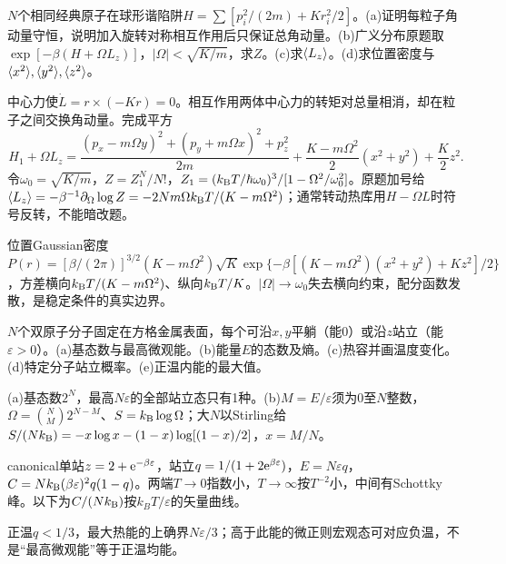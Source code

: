 \begin{exercise}[原题1(a)--(d)]\label{p:333-4-1}
$N$个相同经典原子在球形谐陷阱$H=\sum[p_i^2/(2m)+Kr_i^2/2]$。(a)证明每粒子角动量守恒，说明加入旋转对称相互作用后只保证总角动量。(b)广义分布原题取$\exp[-\beta(H+\Omega L_z)]$，$|\Omega|<\sqrt{K/m}$，求$Z$。(c)求$\langle L_z\rangle$。(d)求位置密度与$\langle x^2\rangle,\langle y^2\rangle,\langle z^2\rangle$。
\end{exercise}
\begin{solution}
中心力使$\dot L=r\times(-Kr)=0$。相互作用两体中心力的转矩对总量相消，却在粒子之间交换角动量。完成平方
\begin{equation}
H_1+\Omega L_z=\frac{(p_x-m\Omega y)^2+(p_y+m\Omega x)^2+p_z^2}{2m}+\frac{K-m\Omega^2}{2}(x^2+y^2)+\frac K2z^2.
\end{equation}
令$\omega_0=\sqrt{K/m}$，$Z=Z_1^N/N!$，$Z_1=(k_{\mathrm B} T/\hbar\omega_0)^3/[1-\Omega^2/\omega_0^2]$。原题加号给$\langle L_z\rangle=-\beta^{-1}\partial_\Omega\log Z=-2Nm\Omega k_{\mathrm B} T/(K-m\Omega^2)$；通常转动热库用$H-\Omega L$时符号反转，不能暗改题。

位置Gaussian密度$P(r)=[\beta/(2\pi)]^{3/2}(K-m\Omega^2)\sqrt K\exp\{-\beta[(K-m\Omega^2)(x^2+y^2)+Kz^2]/2\}$，方差横向$k_{\mathrm B} T/(K-m\Omega^2)$、纵向$k_{\mathrm B} T/K$。$|\Omega|\to\omega_0$失去横向约束，配分函数发散，是稳定条件的真实边界。
\end{solution}
\begin{exercise}[原题2(a)--(e)]\label{p:333-4-2}
$N$个双原子分子固定在方格金属表面，每个可沿$x,y$平躺（能0）或沿$z$站立（能$\varepsilon>0$）。(a)基态数与最高微观能。(b)能量$E$的态数及熵。(c)热容并画温度变化。(d)特定分子站立概率。(e)正温内能的最大值。
\end{exercise}
\begin{solution}
(a)基态数$2^N$，最高$N\varepsilon$的全部站立态只有1种。(b)$M=E/\varepsilon$须为0至$N$整数，$\Omega=\binom NM2^{N-M}$、$S=k_{\mathrm B}\log\Omega$；大$N$以Stirling给$S/(Nk_{\mathrm B})=-x\log x-(1-x)\log[(1-x)/2]$，$x=M/N$。

canonical单站$z=2+\mathrm e^{-\beta\varepsilon}$，站立$q=1/(1+2\mathrm e^{\beta\varepsilon})$，$E=N\varepsilon q$，$C=Nk_{\mathrm B}(\beta\varepsilon)^2q(1-q)$。两端$T\to0$指数小，$T\to\infty$按$T^{-2}$小，中间有Schottky峰。以下为$C/(Nk_{\mathrm B})$按$k_BT/\varepsilon$的矢量曲线。
\begin{center}\end{center}
正温$q<1/3$，最大热能的上确界$N\varepsilon/3$；高于此能的微正则宏观态可对应负温，不是“最高微观能”等于正温均能。
\end{solution}
